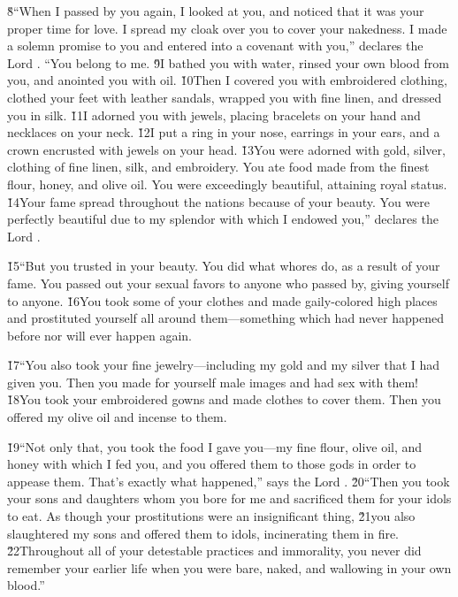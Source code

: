 \v{8}``When I passed by you again, I looked at you, and noticed that it was your proper time for love. I spread my cloak over you to cover your nakedness. I made a solemn promise to you and entered into a covenant with you,'' declares the Lord . ``You belong to me. \v{9}I bathed you with water, rinsed your own blood from you, and anointed you with oil. \v{10}Then I covered you with embroidered clothing, clothed your feet with leather sandals, wrapped you with fine linen, and dressed you in silk. \v{11}I adorned you with jewels, placing bracelets on your hand and necklaces on your neck. \v{12}I put a ring in your nose, earrings in your ears, and a crown encrusted with jewels on your head. \v{13}You were adorned with gold, silver, clothing of fine linen, silk, and embroidery. You ate food made from the finest flour, honey, and olive oil. You were exceedingly beautiful, attaining royal status. \v{14}Your fame spread throughout the nations because of your beauty. You were perfectly beautiful due to my splendor with which I endowed you,'' declares the Lord .

\v{15}``But you trusted in your beauty. You did what whores do, as a result of your fame. You passed out your sexual favors to anyone who passed by, giving yourself to anyone. \v{16}You took some of your clothes and made gaily-colored high places and prostituted yourself all around them---something which had never happened before nor will ever happen again.

\v{17}``You also took your fine jewelry---including my gold and my silver that I had given you. Then you made for yourself male images and had sex with them! \v{18}You took your embroidered gowns and made clothes to cover them. Then you offered my olive oil and incense to them.

\v{19}``Not only that, you took the food I gave you---my fine flour, olive oil, and honey with which I fed you, and you offered them to those gods in order to appease them. That's exactly what happened,'' says the Lord . \v{20}``Then you took your sons and daughters whom you bore for me and sacrificed them for your idols to eat. As though your prostitutions were an insignificant thing, \v{21}you also slaughtered my sons and offered them to idols, incinerating them in fire. \v{22}Throughout all of your detestable practices and immorality, you never did remember your earlier life when you were bare, naked, and wallowing in your own blood.''

